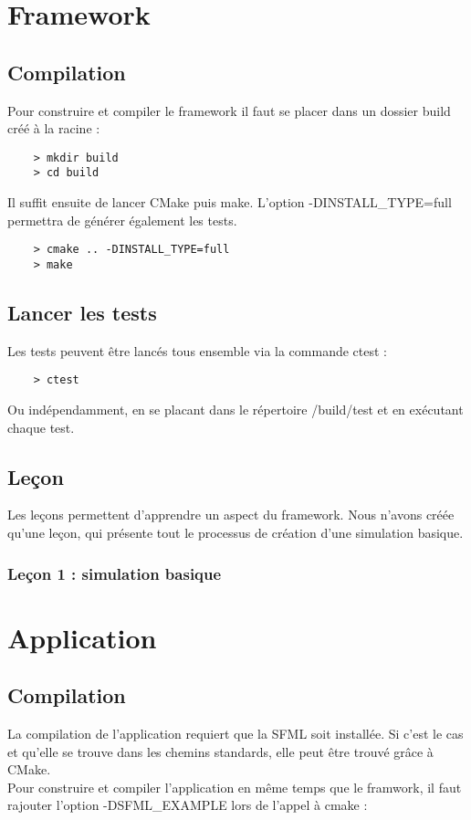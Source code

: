 \section{Framework}
\subsection{Compilation}
Pour construire et compiler le framework il faut se placer dans un dossier build créé à la racine :

\begin{verbatim}
    > mkdir build
    > cd build
\end{verbatim}

Il suffit ensuite de lancer CMake puis make. L'option -DINSTALL_TYPE=full permettra de générer également les tests.

\begin{verbatim}
    > cmake .. -DINSTALL_TYPE=full
    > make
\end{verbatim}

\subsection{Lancer les tests}

Les tests peuvent être lancés tous ensemble via la commande ctest :
\begin{verbatim}
    > ctest
\end{verbatim}

Ou indépendamment, en se placant dans le répertoire /build/test et en exécutant chaque test.

\subsection{Leçon}
Les leçons permettent d'apprendre un aspect du framework. Nous n'avons créée qu'une leçon, qui présente tout le processus de création d'une simulation basique.
\subsubsection{Leçon 1 : simulation basique}


\section{Application}
\subsection{Compilation}
La compilation de l'application requiert que la SFML soit installée. Si c'est le cas et qu'elle se trouve dans les chemins standards, elle peut être trouvé grâce à CMake.\\
Pour construire et compiler l'application en même temps que le framwork, il faut rajouter l'option -DSFML_EXAMPLE lors de l'appel à cmake :\\\\

